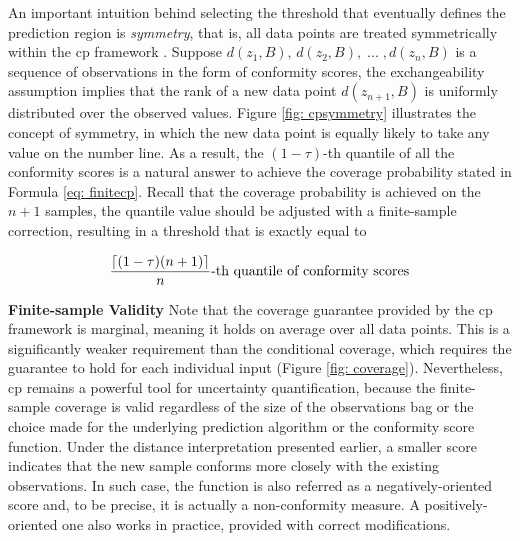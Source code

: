\vspace{0.5em} 
An important intuition behind selecting the threshold that eventually defines the prediction region is \textit{symmetry}, that is, all data points are treated symmetrically within the \gls{cp} framework \cite{angelopoulos2021gentle}. Suppose $d(z_1, B), \, d(z_2, B), \; ... \; ,d(z_n, B)$ is a sequence of observations in the form of conformity scores, the exchangeability assumption implies that the rank of a new data point $d(z_{n+1}, B)$ is uniformly distributed over the observed values. Figure \ref{fig: cpsymmetry} illustrates the concept of symmetry, in which the new data point is equally likely to take any value on the number line. As a result, the $(1 - \tau)$-th quantile of all the conformity scores is a natural answer to achieve the coverage probability stated in Formula \ref{eq: finitecp}. Recall that the coverage probability is achieved on the $n+1$ samples, the quantile value should be adjusted with a finite-sample correction, resulting in a threshold that is exactly equal to 

\begin{equation}
\vspace{0.7em}
\frac{\lceil(1 - \tau)(n + 1)\rceil}{n}\text{-th quantile of conformity scores}
\label{eq:cpquantile}
\vspace{0.7em}
\end{equation}

\noindent
\textbf{Finite-sample Validity} Note that the coverage guarantee provided by the \gls{cp} framework is marginal, meaning it holds on average over all data points. This is a significantly weaker requirement than the conditional coverage, which requires the guarantee to hold for each individual input (Figure \ref{fig: coverage}). Nevertheless, \gls{cp} remains a powerful tool for uncertainty quantification, because the finite-sample coverage is valid regardless of the size of the observations bag or the choice made for the underlying prediction algorithm or the conformity score function. Under the distance interpretation presented earlier, a smaller score indicates that the new sample conforms more closely with the existing observations. In such case, the function is also referred as a negatively-oriented score and, to be precise, it is actually a non-conformity measure. A positively-oriented one also works in practice, provided with correct modifications. 


